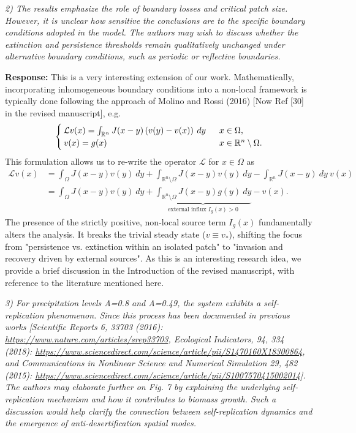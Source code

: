 \documentclass[11pt,a4paper]{article}
\newcommand{\comment}[1]{\vspace{0.5em}\noindent\textit{\textcolor{revcolor}{#1}}}
\newcommand{\response}[1]{\vspace{0.5em}\noindent\textbf{\textcolor{authorcolor}{Response:}} \textcolor{authorcolor}{#1}}
\begin{document}
\comment{2) The results emphasize the role of boundary losses and critical patch size. However, it is unclear how sensitive the conclusions are to the specific boundary conditions adopted in the model. The authors may wish to discuss whether the extinction and persistence thresholds remain qualitatively unchanged under alternative boundary conditions, such as periodic or reflective boundaries.}

\response{
This is a very interesting extension of our work. Mathematically, incorporating inhomogeneous boundary conditions into a non-local framework is typically done following the approach of Molino and Rossi (2016) [Now Ref [30] in the revised manuscript], e.g.
\begin{equation*}
    \begin{cases}
        \mathcal{L}v(x) = \int_{\mathbb{R}^n} J(x-y)\left( v(y) - v(x) \right) \:dy & \hspace{2mm} x \in \Omega, \\
        v(x) = g(x) & \hspace{2mm} x \in \mathbb{R}^n \setminus \Omega.
    \end{cases}
\end{equation*}
This formulation allows us to re-write the operator $\mathcal{L}$ for $x \in \Omega$ as
\begin{align*}
    \mathcal{L}v(x) 
    &=
    \int_{\Omega} J(x-y)v(y)\:dy + \int_{\mathbb{R}^n \setminus \Omega} J(x-y) v(y)\:dy - \int_{\mathbb{R}^n} J(x-y)\:dy\:v(x)\\
    &=
    \int_{\Omega} J(x-y)v(y)\:dy + \underbrace{\int_{\mathbb{R}^n \setminus \Omega} J(x-y)g(y)\:dy}_{\text{external influx } I_g(x) > 0} - v(x).
\end{align*}
The presence of the strictly positive, non-local source term $I_g(x)$ fundamentally alters the analysis. It breaks the trivial steady state ($v \equiv v_*$), shifting the focus from "persistence vs. extinction within an isolated patch" to "invasion and recovery driven by external sources". As this is an interesting research idea, we provide a brief discussion in the Introduction of the revised manuscript, with reference to the literature mentioned here.
}

\comment{3) For precipitation levels A=0.8 and A=0.49, the system exhibits a self-replication phenomenon. Since this process has been documented in previous works [Scientific Reports 6, 33703 (2016): \url{https://www.nature.com/articles/srep33703}, Ecological Indicators, 94, 334 (2018): \url{https://www.sciencedirect.com/science/article/pii/S1470160X18300864}, and Communications in Nonlinear Science and Numerical Simulation 29, 482 (2015): \url{https://www.sciencedirect.com/science/article/pii/S1007570415002014}]. The authors may elaborate further on Fig. 7 by explaining the underlying self-replication mechanism and how it contributes to biomass growth. Such a discussion would help clarify the connection between self-replication dynamics and the emergence of anti-desertification spatial modes.}
\end{document}
